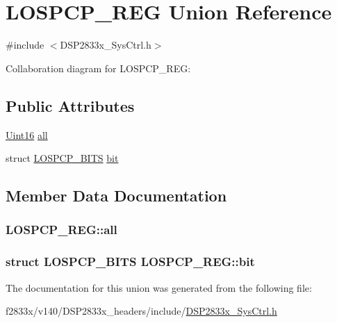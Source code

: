 \hypertarget{union_l_o_s_p_c_p___r_e_g}{}\section{L\+O\+S\+P\+C\+P\+\_\+\+R\+E\+G Union Reference}
\label{union_l_o_s_p_c_p___r_e_g}


{\ttfamily \#include $<$D\+S\+P2833x\+\_\+\+Sys\+Ctrl.\+h$>$}



Collaboration diagram for L\+O\+S\+P\+C\+P\+\_\+\+R\+E\+G\+:
\subsection*{Public Attributes}
\begin{DoxyCompactItemize}
\item 
\hyperlink{_d_s_p2833x___device_8h_a59a9f6be4562c327cbfb4f7e8e18f08b}{Uint16} \hyperlink{union_l_o_s_p_c_p___r_e_g_aff68b322df91ea2c6670964de3b296b5}{all}
\item 
struct \hyperlink{struct_l_o_s_p_c_p___b_i_t_s}{L\+O\+S\+P\+C\+P\+\_\+\+B\+I\+T\+S} \hyperlink{union_l_o_s_p_c_p___r_e_g_a8e0da115cfddedb5794b1d909ffb8f0e}{bit}
\end{DoxyCompactItemize}


\subsection{Member Data Documentation}
\hypertarget{union_l_o_s_p_c_p___r_e_g_aff68b322df91ea2c6670964de3b296b5}{}
\subsubsection[{all}]{ L\+O\+S\+P\+C\+P\+\_\+\+R\+E\+G\+::all}\label{union_l_o_s_p_c_p___r_e_g_aff68b322df91ea2c6670964de3b296b5}
\hypertarget{union_l_o_s_p_c_p___r_e_g_a8e0da115cfddedb5794b1d909ffb8f0e}{}
\subsubsection[{bit}]{\setlength{\rightskip}{0pt plus 5cm}struct {\bf L\+O\+S\+P\+C\+P\+\_\+\+B\+I\+T\+S} L\+O\+S\+P\+C\+P\+\_\+\+R\+E\+G\+::bit}\label{union_l_o_s_p_c_p___r_e_g_a8e0da115cfddedb5794b1d909ffb8f0e}


The documentation for this union was generated from the following file\+:\begin{DoxyCompactItemize}
\item 
f2833x/v140/\+D\+S\+P2833x\+\_\+headers/include/\hyperlink{_d_s_p2833x___sys_ctrl_8h}{D\+S\+P2833x\+\_\+\+Sys\+Ctrl.\+h}\end{DoxyCompactItemize}
